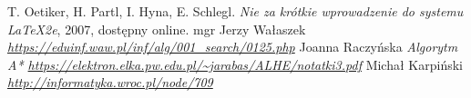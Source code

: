 \documentclass{classrep}
\begin{document}
\begin{thebibliography}{0}
   T. Oetiker, H. Partl, I. Hyna, E. Schlegl.
    \textsl{Nie za krótkie wprowadzenie do systemu \LaTeX2e}, 2007, dostępny
    online.
  mgr Jerzy Wałaszek
	\textsl{\url{https://eduinf.waw.pl/inf/alg/001_search/0125.php}}
 Joanna Raczyńska
	\textsl{Algorytm A* \url{https://elektron.elka.pw.edu.pl/~jarabas/ALHE/notatki3.pdf}}
 Michał Karpiński
	\textsl{\url{http://informatyka.wroc.pl/node/709}}
\end{thebibliography}
\end{document}
